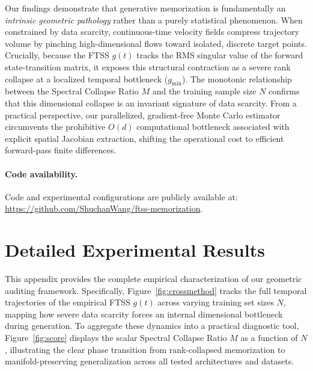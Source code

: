 \documentclass[11pt]{article}
\begin{document}
Our findings demonstrate that generative memorization is fundamentally an \emph{intrinsic geometric pathology} rather than a purely statistical phenomenon. When constrained by data scarcity, continuous-time velocity fields compress trajectory volume by pinching high-dimensional flows toward isolated, discrete target points. Crucially, because the FTSS $g(t)$ tracks the RMS singular value of the forward state-transition matrix, it exposes this structural contraction as a severe rank collapse at a localized temporal bottleneck ($g_{\min}$). The monotonic relationship between the Spectral Collapse Ratio $M$ and the training sample size $N$ confirms that this dimensional collapse is an invariant signature of data scarcity. From a practical perspective, our parallelized, gradient-free Monte Carlo estimator circumvents the prohibitive $O(d)$ computational bottleneck associated with explicit spatial Jacobian extraction, shifting the operational cost to efficient forward-pass finite differences.

\paragraph{Code availability.}
Code and experimental configurations are publicly available at:
\url{https://github.com/ShuchanWang/ftss-memorization}.

\printbibliography

\appendix

\section{Detailed Experimental Results}
\label{app:implementation}

This appendix provides the complete empirical characterization of our geometric auditing framework. Specifically, Figure~\ref{fig:crossmethod} tracks the full temporal trajectories of the empirical FTSS $g(t)$ across varying training set sizes $N$, mapping how severe data scarcity forces an internal dimensional bottleneck during generation. To aggregate these dynamics into a practical diagnostic tool, Figure~\ref{fig:score} displays the scalar Spectral Collapse Ratio $M$ as a function of $N$, illustrating the clear phase transition from rank-collapsed memorization to manifold-preserving generalization across all tested architectures and datasets.
\end{document}
